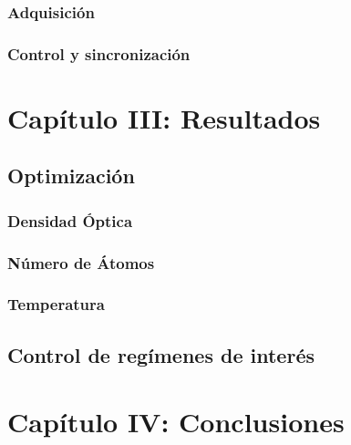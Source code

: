 \documentclass[12pt,twoside]{article}
\begin{document}
\subsubsection{Adquisición}\label{manta}

\subsubsection{Control y sincronización}\label{control}


\section{Capítulo III: Resultados}\label{analisis}

\subsection{Optimización}\label{opt}

\subsubsection{Densidad Óptica}\label{do}

\subsubsection{Número de Átomos}\label{na}

\subsubsection{Temperatura}\label{tem}

\subsection{Control de regímenes de interés}\label{regimenes}



\section{Capítulo IV: Conclusiones}\label{Conclusiones}



\newpage


\end{document}
